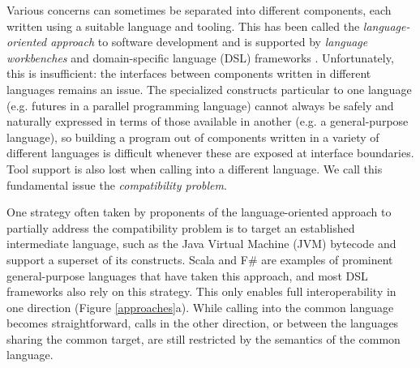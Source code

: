 

Various concerns can sometimes be separated into different components, each written using a suitable language and tooling. This has been called the \emph{language-oriented approach} to software development \cite{language-oriented} and is supported by \emph{language workbenches} \cite{workbenches} and domain-specific language (DSL) frameworks \cite{fowler10}. Unfortunately, this is insufficient: the interfaces between components written in different languages remains an issue. The specialized constructs particular to one language (e.g. futures in a parallel programming language) cannot always be safely and naturally expressed in terms of those available in another (e.g. a general-purpose language), so building a program out of components written in a variety of different languages is difficult whenever these are exposed at interface boundaries. Tool support is also lost when calling into a different language. We call this fundamental issue the \emph{compatibility problem}. 

One strategy often taken by proponents of the language-oriented approach to partially address the compatibility problem is to  target an established intermediate language, such as the Java Virtual Machine (JVM) bytecode and support a superset of its constructs. Scala \cite{scala} and F\# \cite{fsharp} are examples of prominent general-purpose languages that have taken this approach, and most DSL frameworks also rely on this strategy. This only enables full interoperability in one direction (Figure \ref{approaches}a). While calling into the common language becomes straightforward, calls in the other direction, or between the languages sharing the common target, are still restricted by the semantics of the common language. 

